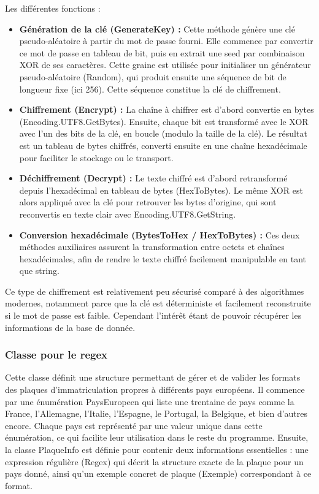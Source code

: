 \documentclass[main.tex]{subfiles}
\begin{document}
Les différentes fonctions : 
\begin{itemize}

\item \textbf{Génération de la clé (GenerateKey) :} Cette méthode génère une clé pseudo-aléatoire à partir du mot de passe fourni. Elle commence par convertir ce mot de passe en tableau de bit, puis en extrait une seed par combinaison XOR de ses caractères. Cette graine est utilisée pour initialiser un générateur pseudo-aléatoire (Random), qui produit ensuite une séquence de bit de longueur fixe (ici 256). Cette séquence constitue la clé de chiffrement. 

\item \textbf{Chiffrement (Encrypt) :} La chaîne à chiffrer est d’abord convertie en bytes (Encoding.UTF8.GetBytes). Ensuite, chaque bit est transformé avec le XOR avec l’un des bits de la clé, en boucle (modulo la taille de la clé). Le résultat est un tableau de bytes chiffrés, converti ensuite en une chaîne hexadécimale pour faciliter le stockage ou le transport. 

\item \textbf{Déchiffrement (Decrypt) :} Le texte chiffré est d’abord retransformé depuis l’hexadécimal en tableau de bytes (HexToBytes). Le même XOR est alors appliqué avec la clé pour retrouver les bytes d’origine, qui sont reconvertis en texte clair avec Encoding.UTF8.GetString. 

\item \textbf{Conversion hexadécimale (BytesToHex / HexToBytes) :} Ces deux méthodes auxiliaires assurent la transformation entre octets et chaînes hexadécimales, afin de rendre le texte chiffré facilement manipulable en tant que string. \\

\end{itemize}

Ce type de chiffrement est relativement peu sécurisé comparé à des algorithmes modernes, notamment parce que la clé est déterministe et facilement reconstruite si le mot de passe est faible. Cependant l'intérêt étant de pouvoir récupérer les informations de la base de donnée.

\subsubsection{Classe pour le regex}

Cette classe définit une structure permettant de gérer et de valider les formats des plaques d’immatriculation propres à différents pays européens. Il commence par une énumération PaysEuropeen qui liste une trentaine de pays comme la France, l’Allemagne, l’Italie, l’Espagne, le Portugal, la Belgique, et bien d’autres encore. Chaque pays est représenté par une valeur unique dans cette énumération, ce qui facilite leur utilisation dans le reste du programme. Ensuite, la classe PlaqueInfo est définie pour contenir deux informations essentielles : une expression régulière (Regex) qui décrit la structure exacte de la plaque pour un pays donné, ainsi qu’un exemple concret de plaque (Exemple) correspondant à ce format. 
\end{document}
